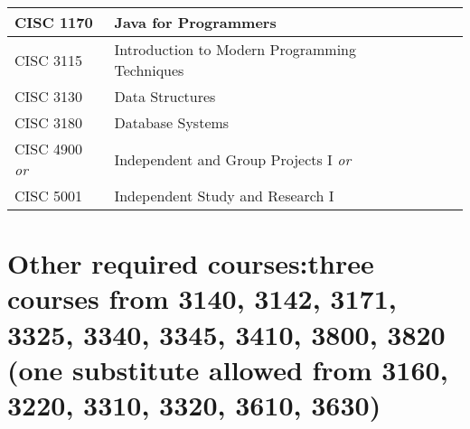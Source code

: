\documentclass{article}
\begin{document}
\begin{Form}
\begin{tabular}{ |p{3.27cm}|p{6cm}|p{4.8cm}|p{2.3cm}|  }
		CISC 1170           & Java for Programmers                          & \TextField[name=1170_instructor,width=4.8cm,charsize=8pt,bordercolor=1 1 1,borderstyle=U]{} & \TextField[name=1170_grade,width=2.2cm,charsize=8pt,bordercolor=1 1 1]{{}} \\
		\hline
		CISC 3115           & Introduction to Modern Programming Techniques & \TextField[name=3115_instructor,width=4.8cm,charsize=8pt,bordercolor=1 1 1,borderstyle=U]{} & \TextField[name=3115_grade,width=2.2cm,charsize=8pt,bordercolor=1 1 1]{{}} \\
		\hline
		CISC 3130           & Data Structures                               & \TextField[name=3130_instructor,width=4.8cm,charsize=8pt,bordercolor=1 1 1,borderstyle=U]{} & \TextField[name=3130_grade,width=2.2cm,charsize=8pt,bordercolor=1 1 1]{{}} \\
		\hline
		CISC 3180           & Database Systems                              & \TextField[name=3180_instructor,width=4.8cm,charsize=8pt,bordercolor=1 1 1,borderstyle=U]{} & \TextField[name=3180_grade,width=2.2cm,charsize=8pt,bordercolor=1 1 1]{{}} \\
		\hline
		CISC 4900 \emph{or} & Independent and Group Projects I \emph{or}    & \TextField[name=4900_instructor,width=4.8cm,charsize=8pt,bordercolor=1 1 1,borderstyle=U]{} & \TextField[name=4900_grade,width=2.2cm,charsize=8pt,bordercolor=1 1 1]{{}} \\
		CISC 5001           & Independent Study and Research I              & \TextField[name=5001_instructor,width=4.8cm,charsize=8pt,bordercolor=1 1 1,borderstyle=U]{} & \TextField[name=5001_grade,width=2.2cm,charsize=8pt,bordercolor=1 1 1]{{}} \\
		\hline
	\end{tabular}


	\section*{Other required courses:\large{three courses from 3140, 3142, 3171, 3325, 3340, 3345, 3410, 3800, 3820 (one substitute allowed from 3160, 3220, 3310, 3320, 3610, 3630})}
	\begin{tabular}{ |p{3.27cm}|p{6cm}|p{4.8cm}|p{2.3cm}|  }


\end{tabular}
\end{Form}
\end{document}
